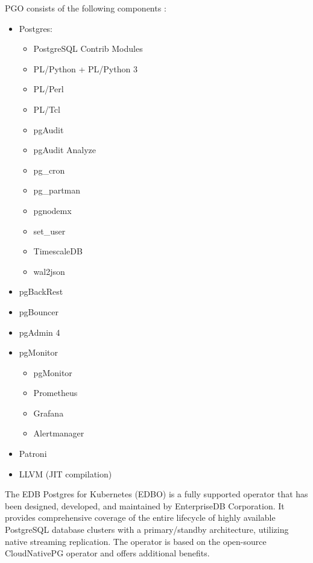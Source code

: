 PGO consists of the following components \cite{CrunchyPGOGit}:
\begin{itemize}
  \item Postgres:
        \begin{itemize}
          \item PostgreSQL Contrib Modules
          \item PL/Python + PL/Python 3
          \item PL/Perl
          \item PL/Tcl
          \item pgAudit
          \item pgAudit Analyze
          \item pg\_cron
          \item pg\_partman
          \item pgnodemx
          \item set\_user
          \item TimescaleDB
          \item wal2json
        \end{itemize}
  \item pgBackRest
  \item pgBouncer
  \item pgAdmin 4
  \item pgMonitor
        \begin{itemize}
          \item pgMonitor
          \item Prometheus
          \item Grafana
          \item Alertmanager
        \end{itemize}
  \item Patroni
  \item LLVM (JIT compilation)
\end{itemize}



\pagebreak

The EDB Postgres for Kubernetes (EDBO) is a fully supported operator that has been designed, developed, and maintained by EnterpriseDB Corporation. It provides comprehensive coverage of the entire lifecycle of highly available PostgreSQL database clusters with a primary/standby architecture, utilizing native streaming replication. The operator is based on the open-source CloudNativePG operator and offers additional benefits. \cite{OperatorHubEDB}


